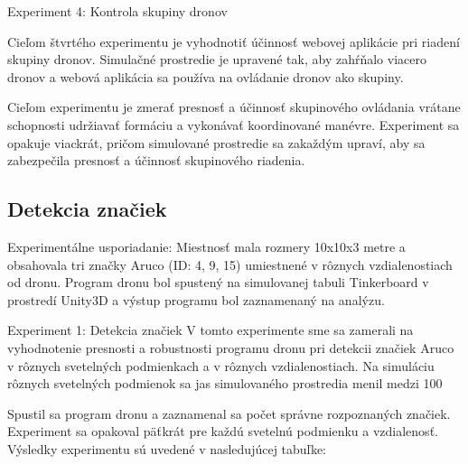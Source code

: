 Experiment 4: Kontrola skupiny dronov

Cieľom štvrtého experimentu je vyhodnotiť účinnosť webovej aplikácie pri riadení skupiny dronov. Simulačné prostredie je upravené tak, aby zahŕňalo viacero dronov a webová aplikácia sa používa na ovládanie dronov ako skupiny.

Cieľom experimentu je zmerať presnosť a účinnosť skupinového ovládania vrátane schopnosti udržiavať formáciu a vykonávať koordinované manévre. Experiment sa opakuje viackrát, pričom simulované prostredie sa zakaždým upraví, aby sa zabezpečila presnosť a účinnosť skupinového riadenia.

\subsection{Detekcia značiek}
Experimentálne usporiadanie:
Miestnosť mala rozmery 10x10x3 metre a obsahovala tri značky Aruco (ID: 4, 9, 15) umiestnené v rôznych vzdialenostiach od dronu. Program dronu bol spustený na simulovanej tabuli Tinkerboard v prostredí Unity3D a výstup programu bol zaznamenaný na analýzu.

Experiment 1: Detekcia značiek
V tomto experimente sme sa zamerali na vyhodnotenie presnosti a robustnosti programu dronu pri detekcii značiek Aruco v rôznych svetelných podmienkach a v rôznych vzdialenostiach. Na simuláciu rôznych svetelných podmienok sa jas simulovaného prostredia menil medzi 100 %

Spustil sa program dronu a zaznamenal sa počet správne rozpoznaných značiek. Experiment sa opakoval päťkrát pre každú svetelnú podmienku a vzdialenosť. Výsledky experimentu sú uvedené v nasledujúcej tabuľke:

